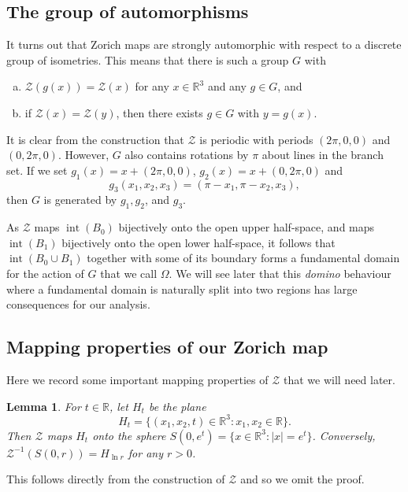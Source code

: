 \documentclass[11pt]{amsart}
\newtheorem{lemma}[theorem]{Lemma}
\numberwithin{equation}{section}
\theoremstyle{definition}
\theoremstyle{definition}
\theoremstyle{definition}
\newcommand{\R}{\mathbb{R}}
\begin{document}
\subsection{The group of automorphisms}

It turns out that Zorich maps are strongly automorphic with respect to a discrete group of isometries. This means that there is such a group $G$ with 
\begin{enumerate}[(a)]
\item $\mathcal{Z}(g(x)) = \mathcal{Z}(x)$ for any $x\in \R^3$ and any $g\in G$, and
\item if $\mathcal{Z}(x) = \mathcal{Z}(y)$, then there exists $g\in G$ with $y=g(x)$.
\end{enumerate}

It is clear from the construction that $\mathcal{Z}$ is periodic with periods $(2\pi,0,0)$ and $(0,2\pi,0)$. However, $G$ also contains rotations by $\pi$ about lines in the branch set. If we set $g_1(x) = x + (2\pi,0,0)$, $g_2(x) = x + (0,2\pi , 0)$ and 
\[ g_3(x_1,x_2,x_3) = (\pi-x_1,\pi - x_2 , x_3), \]
then $G$ is generated by $g_1,g_2$, and $g_3$.

As $\mathcal{Z}$ maps $\operatorname{int}(B_0)$ bijectively onto the open upper half-space, and maps $\operatorname{int}(B_1)$ bijectively onto the open lower half-space, it follows that $\operatorname{int}(B_0 \cup B_1)$ together with some of its boundary forms a fundamental domain for the action of $G$ that we call $\Omega$. We will see later that this {\it domino} behaviour where a fundamental domain is naturally split into two regions has large consequences for our analysis.

\subsection{Mapping properties of our Zorich map}

Here we record some important mapping properties of $\mathcal{Z}$ that we will need later.

\begin{lemma}
    \label{lem:1}
For $t\in \R$, let $H_t$ be the plane 
\[ H_t = \{ (x_1,x_2,t) \in \R^3 : x_1,x_2\in \R \} .\]
Then $\mathcal{Z}$ maps $H_t$ onto the sphere $S(0,e^t) = \{ x\in \R^3 : |x| = e^t \}$. Conversely, $\mathcal{Z}^{-1}(S(0,r)) = H_{\ln r}$ for any $r>0$.
\end{lemma}

This follows directly from the construction of $\mathcal{Z}$ and so we omit the proof.
\end{document}
